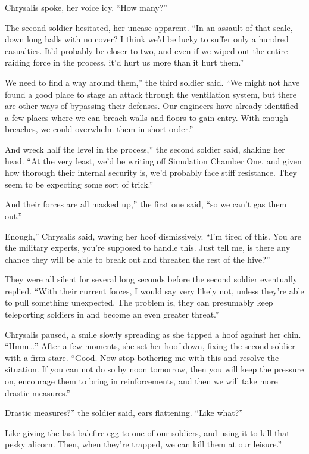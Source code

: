 Chrysalis spoke, her voice icy. “How many?”

The second soldier hesitated, her unease apparent. “In an assault of that scale, down long halls with no cover? I think we’d be lucky to suffer only a hundred casualties. It’d probably be closer to two, and even if we wiped out the entire raiding force in the process, it’d hurt us more than it hurt them.”

\leavevmode{}We need to find a way around them,” the third soldier said. “We might not have found a good place to stage an attack through the ventilation system, but there are other ways of bypassing their defenses. Our engineers have already identified a few places where we can breach walls and floors to gain entry. With enough breaches, we could overwhelm them in short order.”

\leavevmode{}And wreck half the level in the process,” the second soldier said, shaking her head. “At the very least, we’d be writing off Simulation Chamber One, and given how thorough their internal security is, we’d probably face stiff resistance. They seem to be expecting some sort of trick.”

\leavevmode{}And their forces are all masked up,” the first one said, “so we can’t gas them out.”

\leavevmode{}Enough,” Chrysalis said, waving her hoof dismissively. “I’m tired of this. You are the military experts, you’re supposed to handle this. Just tell me, is there any chance they will be able to break out and threaten the rest of the hive?”

They were all silent for several long seconds before the second soldier eventually replied. “With their current forces, I would say very likely not, unless they’re able to pull something unexpected. The problem is, they can presumably keep teleporting soldiers in and become an even greater threat.”

Chrysalis paused, a smile slowly spreading as she tapped a hoof against her chin. “Hmm…” After a few moments, she set her hoof down, fixing the second soldier with a firm stare. “Good. Now stop bothering me with this and resolve the situation. If you can not do so by noon tomorrow, then you will keep the pressure on, encourage them to bring in reinforcements, and then we will take more drastic measures.”

\leavevmode{}Drastic measures?” the soldier said, ears flattening. “Like what?”

\leavevmode{}Like giving the last balefire egg to one of our soldiers, and using it to kill that pesky alicorn. Then, when they’re trapped, we can kill them at our leisure.”

